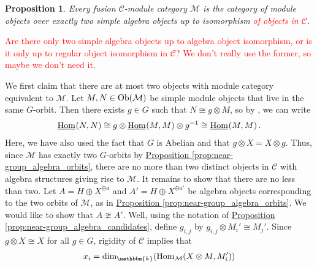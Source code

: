 \documentclass[12pt, reqno]{amsart}
\numberwithin{equation}{section}
\theoremstyle{plainspace}
\newtheorem{proposition}[theorem]{Proposition}
\theoremstyle{definitionspace}
\theoremstyle{remarkspace}
\renewenvironment{proof}{{\noindent\textbf{Proof.}}}{\null\hfill\qedsymbol}
\newcommand{\mathcat}[1]{\mathcal{#1}}
\newcommand{\Ob}{\textup{Ob}}
\newcommand{\Hom}[2][]{
	\ifthenelse{\equal{#2}{}}
		{\textup{Hom}_{#1}}
		{\textup{Hom}_{#1}\!\left(#2\right)}
}
\newcommand{\IntHom}[2][]{
	\ifthenelse{\equal{#2}{}}
		{\underline{\textup{Hom}}_{#1}}
		{\underline{\textup{Hom}}_{#1}\!\left(#2\right)}
}
\begin{document}
\begin{proposition}\label{prop:near-group_algebra_equivalence_classes}
Every fusion $\mathcat{C}$-module category $\mathcat{M}$ is the category of module objects over exactly two simple algebra objects up to isomorphism \textcolor{red}{of objects in $\mathcat{C}$}.
\end{proposition}
\leavevmode

\noindent \textcolor{red}{Are there only two simple algebra objects up to algebra object isomorphism, or is it only up to regular object isomorphism in $\mathcat{C}$? We don't really use the former, so maybe we don't need it.}
\newline

\begin{proof}
\noindent We first claim that there are at most two objects with module category equivalent to $\mathcat{M}$. Let $M, N \in \Ob(\mathcat{M})$ be simple module objects that live in the same $G$-orbit. Then there exists $g \in G$ such that $N \cong g \otimes M$, so by \cite[Lemma 3.3]{Ostrik_2003}, we can write
\begin{align*}
\begin{split}
\IntHom{N, N} \cong g \otimes \IntHom{M, M} \otimes g^{-1} \cong \IntHom{M, M}.
\end{split}
\end{align*}
\noindent Here, we have also used the fact that $G$ is Abelian and that $g \otimes X = X \otimes g$. Thus, since $\mathcat{M}$ has exactly two $G$-orbits by \hyperref[prop:near-group_algebra_orbits]{Proposition \ref*{prop:near-group_algebra_orbits}}, there are no more than two distinct objects in $\mathcat{C}$ with algebra structures giving rise to $\mathcat{M}$. It remains to show that there are no less than two.
\newline\newline
\noindent Let $A = H \oplus X^{\oplus a}$ and $A' = H \oplus X^{\oplus a'}$ be algebra objects corresponding to the two orbits of $\mathcat{M}$, as in \hyperref[prop:near-group_algebra_orbits]{Proposition \ref*{prop:near-group_algebra_orbits}}. We would like to show that $A \ncong A'$. Well, using the notation of \hyperref[prop:near-group_algebra_candidates]{Proposition \ref*{prop:near-group_algebra_candidates}}, define $g_{i,j}$ by $g_{i,j} \otimes M_i' \cong M_j'$. Since $g \otimes X \cong X$ for all $g \in G$, rigidity of $\mathcat{C}$ implies that
\begin{align*}
\begin{split}
x_i &= \dim_{\mathbbm{k}}(\Hom[\mathcat{M}]{X \otimes M, M_i'}) \\

\end{split}
\end{align*}
\end{proof}
\end{document}
